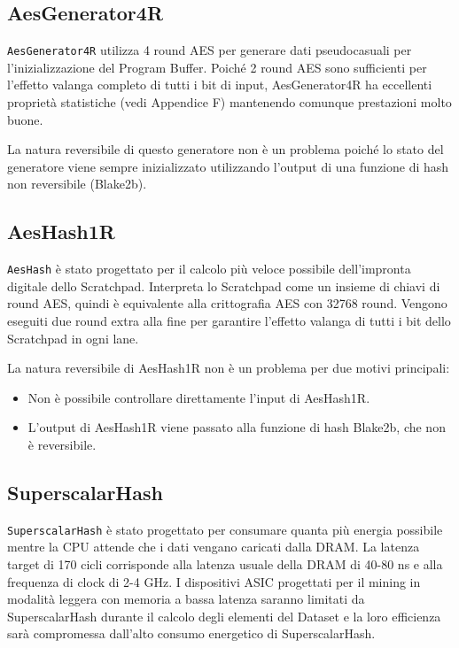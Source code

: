 \subsection{AesGenerator4R}

\texttt{AesGenerator4R} utilizza 4 round AES per generare dati pseudocasuali per l'inizializzazione del Program Buffer. Poiché 2 round AES sono sufficienti per l'effetto valanga completo di tutti i bit di input, AesGenerator4R ha eccellenti proprietà statistiche (vedi Appendice F) mantenendo comunque prestazioni molto buone.

La natura reversibile di questo generatore non è un problema poiché lo stato del generatore viene sempre inizializzato utilizzando l'output di una funzione di hash non reversibile (Blake2b).

\subsection{AesHash1R}

\texttt{AesHash} è stato progettato per il calcolo più veloce possibile dell'impronta digitale dello Scratchpad. Interpreta lo Scratchpad come un insieme di chiavi di round AES, quindi è equivalente alla crittografia AES con 32768 round. Vengono eseguiti due round extra alla fine per garantire l'effetto valanga di tutti i bit dello Scratchpad in ogni lane.

La natura reversibile di AesHash1R non è un problema per due motivi principali:

\begin{itemize}
  \item Non è possibile controllare direttamente l'input di AesHash1R.
  \item L'output di AesHash1R viene passato alla funzione di hash Blake2b, che non è reversibile.
\end{itemize}

\subsection{SuperscalarHash}

\texttt{SuperscalarHash} è stato progettato per consumare quanta più energia possibile mentre la CPU attende che i dati vengano caricati dalla DRAM. La latenza target di 170 cicli corrisponde alla latenza usuale della DRAM di 40-80 ns e alla frequenza di clock di 2-4 GHz. I dispositivi ASIC progettati per il mining in modalità leggera con memoria a bassa latenza saranno limitati da SuperscalarHash durante il calcolo degli elementi del Dataset e la loro efficienza sarà compromessa dall'alto consumo energetico di SuperscalarHash.

